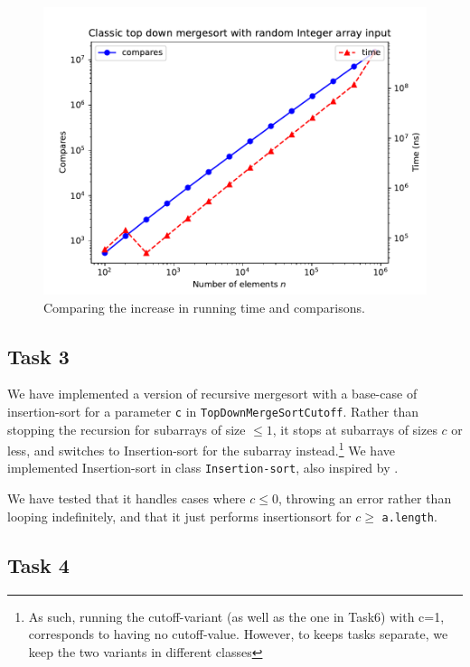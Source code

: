 \documentclass[11pt, a4paper]{article}
\begin{document}
\begin{figure}[h]
  \begin{center}
    \includegraphics[width=\textwidth]{plot/t2p1.pdf}
    \caption{Comparing the increase in running time and comparisons.}
    \label{fig:t2p1}
  \end{center}
\end{figure}

\subsection{Task 3}

We have implemented a version of recursive mergesort with a base-case of insertion-sort for a parameter \verb|c| in \verb|TopDownMergeSortCutoff|. Rather than stopping the recursion for subarrays of size $\leq 1$, it stops at subarrays of sizes $c$ or less, and switches to Insertion-sort for the subarray instead.\footnote{As such, running the cutoff-variant (as well as the one in Task6) with c=1, corresponds to having no cutoff-value. However, to keeps tasks separate, we keep the two variants in different classes} We have implemented Insertion-sort in class \verb|Insertion-sort|, also inspired by \cite{Sedgewick_Wayne_2011}. 

We have tested that it handles cases where $c\leq 0$, throwing an error rather than looping indefinitely, and that it just performs insertionsort for $c\geq$ \verb|a.length|.

\subsection{Task 4}
\end{document}
